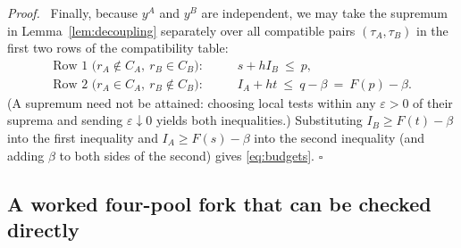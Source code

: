 \documentclass[11pt,letterpaper]{article}
\newenvironment{proof}[1][Proof]{\par\smallskip\noindent\textit{#1.}\ \ignorespaces}{\hfill$\square$\par\medskip}
\begin{document}
\begin{proof}
Finally, because $y^A$ and $y^B$ are independent, we may take the supremum in Lemma~\ref{lem:decoupling} separately over all compatible pairs $(\tau_A,\tau_B)$ in the first two rows of the compatibility table:
\begin{align*}
  \text{Row 1 ($r_A\notin C_A,\ r_B\in C_B$):} \qquad & s + h I_B\ \le\ p,\\
  \text{Row 2 ($r_A\in C_A,\ r_B\notin C_B$):} \qquad & I_A + h t\ \le\ q - \beta\ =\ F(p) - \beta.
\end{align*}
(A supremum need not be attained: choosing local tests within any $\varepsilon>0$ of their suprema and sending $\varepsilon\downarrow 0$ yields both inequalities.) Substituting $I_B\ge F(t)-\beta$ into the first inequality and $I_A\ge F(s)-\beta$ into the second inequality (and adding $\beta$ to both sides of the second) gives \eqref{eq:budgets}.
\end{proof}

\subsection{A worked four-pool fork that can be checked directly}
\end{document}
